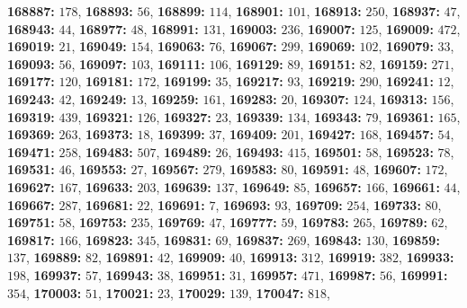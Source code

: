 \textsf{\bfseries 168887:} $178$, \textsf{\bfseries 168893:} $56$, \textsf{\bfseries 168899:} $114$, \textsf{\bfseries 168901:} $101$, \textsf{\bfseries 168913:} $250$, \textsf{\bfseries 168937:} $47$, \textsf{\bfseries 168943:} $44$, \textsf{\bfseries 168977:} $48$, \textsf{\bfseries 168991:} $131$, \textsf{\bfseries 169003:} $236$, \textsf{\bfseries 169007:} $125$, \textsf{\bfseries 169009:} $472$, \textsf{\bfseries 169019:} $21$, \textsf{\bfseries 169049:} $154$, \textsf{\bfseries 169063:} $76$, \textsf{\bfseries 169067:} $299$, \textsf{\bfseries 169069:} $102$, \textsf{\bfseries 169079:} $33$, \textsf{\bfseries 169093:} $56$, \textsf{\bfseries 169097:} $103$, \textsf{\bfseries 169111:} $106$, \textsf{\bfseries 169129:} $89$, \textsf{\bfseries 169151:} $82$, \textsf{\bfseries 169159:} $271$, \textsf{\bfseries 169177:} $120$, \textsf{\bfseries 169181:} $172$, \textsf{\bfseries 169199:} $35$, \textsf{\bfseries 169217:} $93$, \textsf{\bfseries 169219:} $290$, \textsf{\bfseries 169241:} $12$, \textsf{\bfseries 169243:} $42$, \textsf{\bfseries 169249:} $13$, \textsf{\bfseries 169259:} $161$, \textsf{\bfseries 169283:} $20$, \textsf{\bfseries 169307:} $124$, \textsf{\bfseries 169313:} $156$, \textsf{\bfseries 169319:} $439$, \textsf{\bfseries 169321:} $126$, \textsf{\bfseries 169327:} $23$, \textsf{\bfseries 169339:} $134$, \textsf{\bfseries 169343:} $79$, \textsf{\bfseries 169361:} $165$, \textsf{\bfseries 169369:} $263$, \textsf{\bfseries 169373:} $18$, \textsf{\bfseries 169399:} $37$, \textsf{\bfseries 169409:} $201$, \textsf{\bfseries 169427:} $168$, \textsf{\bfseries 169457:} $54$, \textsf{\bfseries 169471:} $258$, \textsf{\bfseries 169483:} $507$, \textsf{\bfseries 169489:} $26$, \textsf{\bfseries 169493:} $415$, \textsf{\bfseries 169501:} $58$, \textsf{\bfseries 169523:} $78$, \textsf{\bfseries 169531:} $46$, \textsf{\bfseries 169553:} $27$, \textsf{\bfseries 169567:} $279$, \textsf{\bfseries 169583:} $80$, \textsf{\bfseries 169591:} $48$, \textsf{\bfseries 169607:} $172$, \textsf{\bfseries 169627:} $167$, \textsf{\bfseries 169633:} $203$, \textsf{\bfseries 169639:} $137$, \textsf{\bfseries 169649:} $85$, \textsf{\bfseries 169657:} $166$, \textsf{\bfseries 169661:} $44$, \textsf{\bfseries 169667:} $287$, \textsf{\bfseries 169681:} $22$, \textsf{\bfseries 169691:} $7$, \textsf{\bfseries 169693:} $93$, \textsf{\bfseries 169709:} $254$, \textsf{\bfseries 169733:} $80$, \textsf{\bfseries 169751:} $58$, \textsf{\bfseries 169753:} $235$, \textsf{\bfseries 169769:} $47$, \textsf{\bfseries 169777:} $59$, \textsf{\bfseries 169783:} $265$, \textsf{\bfseries 169789:} $62$, \textsf{\bfseries 169817:} $166$, \textsf{\bfseries 169823:} $345$, \textsf{\bfseries 169831:} $69$, \textsf{\bfseries 169837:} $269$, \textsf{\bfseries 169843:} $130$, \textsf{\bfseries 169859:} $137$, \textsf{\bfseries 169889:} $82$, \textsf{\bfseries 169891:} $42$, \textsf{\bfseries 169909:} $40$, \textsf{\bfseries 169913:} $312$, \textsf{\bfseries 169919:} $382$, \textsf{\bfseries 169933:} $198$, \textsf{\bfseries 169937:} $57$, \textsf{\bfseries 169943:} $38$, \textsf{\bfseries 169951:} $31$, \textsf{\bfseries 169957:} $471$, \textsf{\bfseries 169987:} $56$, \textsf{\bfseries 169991:} $354$, \textsf{\bfseries 170003:} $51$, \textsf{\bfseries 170021:} $23$, \textsf{\bfseries 170029:} $139$, \textsf{\bfseries 170047:} $818$, 
